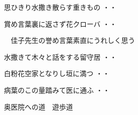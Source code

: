 \begin{shiika}思ひきり水撒き散らす重きもの
\hfill{・・}\end{shiika}
\begin{shiika}賞め言葉裏に返さず花クローバ
\hfill{・・}\end{shiika}
\qquad\qquad\qquad　佳子先生の誉め言葉素直にうれしく思う
\begin{shiika}水撒きて木々と話をする留守居
\hfill{・・}\end{shiika}
\begin{shiika}白粉花空家となりし垣に満つ
\hfill{・・}\end{shiika}
\begin{shiika}病葉のこの量踏みて医に通ふ
\hfill{・・}\end{shiika}
\qquad\qquad\qquad 奥医院への道　遊歩道\\

